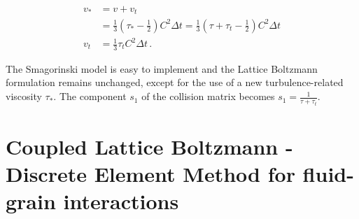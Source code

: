 \begin{align}
\mathit{v}_{*} & 
=\mathit{v}+\mathit{v}_{\mathit{t}} \nonumber \\
	& =\frac{1}{3}(\tau_{*}-\frac{1}{2})
\mathit{C}^{2} \Delta \mathit{t} 
=\frac{1}{3}(\tau+\tau_{t}-\frac{1}{2})\mathit{C}^{2} \Delta \mathit{t}  \\
\mathit{v}_{\mathit{t}} & =\frac{1}{3}\tau_{\mathit{t}}\mathit{C}^{2} \Delta 
\textit{t} \,.
\end{align} 

The Smagorinski model is easy to implement and the Lattice Boltzmann 
formulation remains unchanged, except for the use of a new turbulence-related 
viscosity $\tau_{*}$. The component $s_1$ of the collision matrix becomes $s_1 
= \frac{1}{\tau+\tau_t}$.


\section[Coupled LB-DEM for fluid--grain interactions]{Coupled Lattice 
Boltzmann - Discrete Element Method for fluid-grain
interactions}

